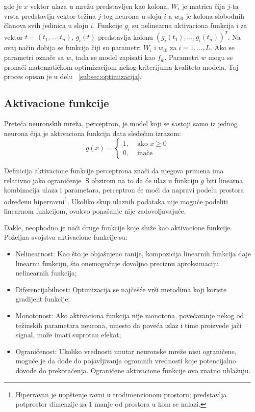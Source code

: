gde je $x$ vektor ulaza u mrežu predstavljen kao kolona, $W_i$ je matrica čija $j$-ta vrsta predstavlja vektor težina $j$-tog neurona u sloju $i$ a $w_{i0}$ je kolona slobodnih članova svih jedinica u sloju $i$. Funkcije $g_i$ su nelinearna aktivaciona funkcija i za vektor $t=(t_1, ..., t_n)$, $g_i(t)$ predstavlja kolonu $(g_i(t_1), ..., g_i(t_n))^T$. Na ovaj način dobija se funkcija čiji su parametri $W_i$ i $w_{i0}$ za $i=1,...,L$. Ako se parametri označe sa $w$, tada se model zapisati kao $f_w$. Parametri $w$ mogu se pronaći matematičkom optimizacijom nekog kriterijuma kvaliteta modela. Taj proces opisan je u delu ~\ref{subsec:optimizacija}.

\subsection{Aktivacione funkcije}


Preteča neuronskih mreža, perceptron, je model koji se sastoji samo iz jednog neurona čija je aktivaciona funkcija data sledećim izrazom:
\begin{equation}
	g(x)=
	\begin{cases}
		1, 	& \text{~ako~} x \geq 0 \\
		0, 	& \text{~inače}
	\end{cases}
\end{equation} 

Definicija aktivacione funkcije perceptrona znači da njegova primena ima relativno jako ograničenje. S obzirom na to da će ulaz u funkciju $g$ biti linearna kombinacija ulaza i parametara, perceptron će moći da napravi podelu prostora određenu hiperravni\footnote{Hiperravan je uopštenje ravni u trodimenzionom prostoru; predstavlja potprostor dimenzije za $1$ manje od prostora u kom se nalazi.}. Ukoliko skup ulaznih podataka nije moguće podeliti linearnom funkcijom, ovakvo ponašanje nije zadovoljavajuće.
\par
Dakle, neophodno je naći druge funkcije koje služe kao aktivacione funkcije. Poželjna svojstva aktivacione funkcije su:
\begin{itemize}
	\item Nelinearnost: Kao što je objašnjeno ranije, kompozicija linearnih funkcija daje linearnu funkciju, što onemogućuje dovoljno preciznu aproksimaciju nelinearnih funkcija;
	\item Diferencijabilnost: Optimizacija se najčešće vrši metodima koji koriste gradijent funkcije;
	\item Monotonost: Ako aktivaciona funkcija nije monotona, povećavanje nekog od težinskih parametara neurona, umesto da poveća izlaz i time proizvede jači signal, može imati suprotan efekat;
	\item Ograničenost: Ukoliko vrednosti unutar neuronske mreže nisu ograničene, moguće je da dođe do pojavljivanja ogromnih vrednosti koje potencijalno dovode do prekoračenja. Ograničene aktivacione funkcije ovo znatno ublažuju. 
\end{itemize}

